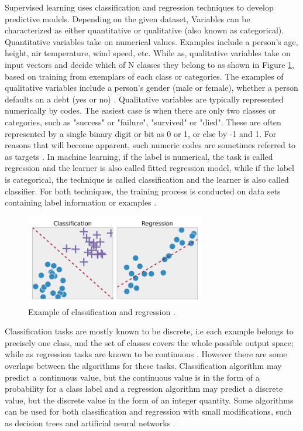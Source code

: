 Supervised learning uses classification and regression techniques
to develop predictive models. Depending on the given dataset, Variables can be characterized as either quantitative or qualitative (also known as categorical). Quantitative variables take on numerical values. Examples include a person's age, height, air temperature, wind speed, etc. While as, qualitative variables take on input vectors and decide which of N classes
they belong to as shown in Figure \ref{RC}, based on training from exemplars of each class or categories. The  
examples of qualitative variables include a person’s gender (male or female), whether a person defaults on a debt (yes or no) \citep{aitkin2009statistical}. Qualitative variables are typically represented numerically by codes. The easiest case is when there are only two classes or categories, such as "success"
or "failure", "survived" or "died". These are often represented by a single binary digit or bit as 0 or 1, or else by -1 and 1. For reasons that will become apparent, such numeric codes are sometimes referred to as targets \citep{friedman2001elements}. In machine learning, if the label is numerical, the task is called regression and the learner is also called fitted regression model, while if the label is categorical, the technique is called classification and the learner is also called classifier. For both techniques, the training process is conducted on data sets containing label information or examples \citep{zhou2012ensemble}.

\begin{figure}[H]
  \centering
    \includegraphics[width=0.7\textwidth]{images/RC.png}
    \caption{Example of classification and regression \citep{rossant2018ipython}.}
  \label{RC}
  
\end{figure}
Classification tasks are mostly known to be discrete, i.e each example belongs to precisely one class, and the set of classes covers the whole possible output space; while as regression tasks are known to be continuous \citep{stephen2009machine}. However there are some overlaps between the algorithms for these tasks. Classification algorithm may predict a continuous value, but the continuous value is in the form of a probability for a class label and a regression algorithm may predict a discrete value, but the discrete value in the form of an integer quantity. Some algorithms can be used for both classification and regression with small modifications, such as decision trees and artificial neural networks \citep{brownlee2013prepare}.  


